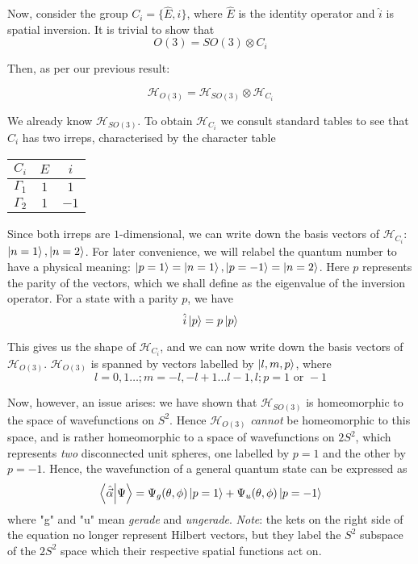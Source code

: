 \documentclass[12pt]{article}
\begin{document}
	Now, consider the group $C_i=\{\hat{E},\hat{i}\}$, where $\hat{E}$ is the identity operator and $\hat{i}$ is spatial inversion. It is trivial to show that
	$$O(3)=SO(3)\otimes C_i$$
	
	Then, as per our previous result:
	
	$$\mathcal{H}_{O(3)}=\mathcal{H}_{SO(3)}\otimes\mathcal{H}_{C_i}$$
	
	We already know $\mathcal{H}_{SO(3)}$. To obtain $\mathcal{H}_{C_i}$ we consult standard tables \cite[p.138]{altmann_inversion_group} to see that $C_i$ has two irreps, characterised by the character table
	
	\begin{center}
	\begin{tabular}{c | c c}
	$C_i$ & $E$ & $i$\\
	\hline
	$\Gamma_1$ & $1$ & $1$\\
	$\Gamma_2$ & $1$ & $-1$
	\end{tabular}
	\end{center}
	
	Since both irreps are $1$-dimensional, we can write down the basis vectors of $\mathcal{H}_{C_i}$: $\ket{n=1}, \ket{n=2}$. For later convenience, we will relabel the quantum number to have a physical meaning: $\ket{p=1}=\ket{n=1}, \ket{p=-1}=\ket{n=2}$. Here $p$ represents the parity of the vectors, which we shall define as the eigenvalue of the inversion operator. For a state with a parity $p$, we have 
	$$\hat{i}\ket{p}=p\ket{p}$$
	
	This gives us the shape of $\mathcal{H}_{C_i}$, and we can now write down the basis vectors of $\mathcal{H}_{O(3)}$. $\mathcal{H}_{O(3)}$ is spanned by vectors labelled by $\ket{l,m,p}$, where
	$$l=0, 1\dots; m=-l,-l+1\dots l-1,l; p=1\text{ or }-1$$
	
	Now, however, an issue arises: we have shown that $\mathcal{H}_{SO(3)}$ is homeomorphic to the space of wavefunctions on $S^2$. Hence $\mathcal{H}_{O(3)}$ \textit{cannot} be homeomorphic to this space, and is rather homeomorphic to a space of wavefunctions on $2S^2$, which represents \textit{two} disconnected unit spheres, one labelled by $p=1$ and the other by $p=-1$. Hence, the wavefunction of a general quantum state can be expressed as
	$$\braket{\hat{\vec{\alpha}}}{\Psi}=\Psi_g(\theta,\phi)\ket{p=1}+\Psi_u(\theta,\phi)\ket{p=-1}$$
	where "g" and "u" mean \textit{gerade} and \textit{ungerade}. \textit{Note}: the kets on the right side of the equation no longer represent Hilbert vectors, but they label the $S^2$ subspace of the $2S^2$ space which their respective spatial functions act on.
	
\end{document}
